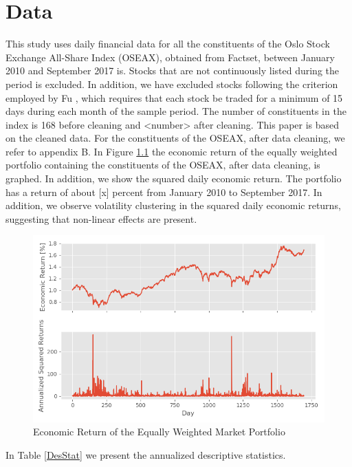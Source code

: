 \chapter{Data}
\label{Da}

This study uses daily financial data for all the constituents of the Oslo Stock Exchange All-Share Index (OSEAX), obtained from Factset, between January 2010 and September 2017 is. Stocks that are not continuously listed during the period is excluded. In addition, we have excluded stocks following the criterion employed by Fu \cite{Fu}, which requires that each stock be traded for a minimum of 15 days during each month of the sample period. The number of constituents in the index is 168 before cleaning and <number> after cleaning. This paper is based on the cleaned data. For the constituents of the OSEAX, after data cleaning, we refer to appendix B. In Figure \ref{MarketReturn} the economic return of the equally weighted portfolio containing the constituents of the OSEAX, after data cleaning, is graphed. In addition, we show the squared daily economic return. The portfolio has a return of about [x] percent from January 2010 to September 2017. In addition, we observe volatility clustering in the squared daily economic returns, suggesting that non-linear effects are present.

\begin{figure}[h]
\label{MarketReturn}
    \centering
    \includegraphics[scale = 0.65]{Plot/MarketReturn.png}
    \caption{Economic Return of the Equally Weighted Market Portfolio}
    \label{MarketReturn}
\end{figure}

In Table \ref{DesStat} we present the annualized descriptive statistics.

